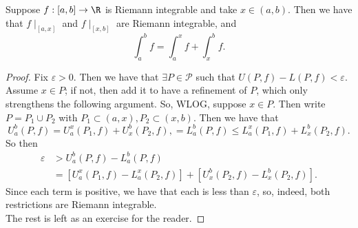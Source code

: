 \documentclass{notes}
\begin{document}
\begin{proposition}[Splitting]
  Suppose $f:[a,b] \to \R$ is Riemann integrable and take $x\in(a,b).$ Then we have that
  $f\mid_{[a,x]}$ and $f\mid_{[x,b]}$ are Riemann integrable, and 
  $$\int_a^b f = \int_a^x f + \int_x^b f.$$
\end{proposition}
\begin{proof}
  Fix $\varepsilon > 0$. Then we have that $\exists P \in\mathcal{P}$ such that $U(P, f) - L(P,f) <
  \varepsilon.$ Assume $x\in P$; if not, then add it to have a refinement of $P$, which only
  strengthens the following argument. So, WLOG, suppose $x\in P$. Then write $P = P_1 \cup P_2$ with
  $P_1 \subset (a,x), P_2 \subset (x,b)$. Then we have that 
  $$U_a^b(P, f) = U_a^x(P_1,f) + U_x^b(P_2, f), = L_a^b(P, f) \leq L_a^x(P_1,f) + L_x^b(P_2,
  f).$$
  So then 
  \begin{align*}
    \varepsilon &> U_a^b(P,f) - L_a^b(P,f) \\
                &= \left[ U_a^x(P_1, f) - L_a^x(P_2, f) \right] + \left[ U_x^b(P_2, f) - L_x^b(P_2,
  f) \right].
  \end{align*}
  Since each term is positive, we have that each is less than $\varepsilon$, so, indeed, both
  restrictions are Riemann integrable. \\

  The rest is left as an exercise for the reader.
\end{proof}
\end{document}
